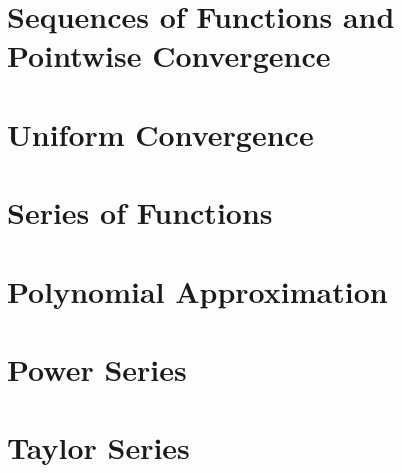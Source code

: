 \documentclass{book}
\begin{document}
\section{Sequences of Functions and Pointwise Convergence}
\section{Uniform Convergence}
\section{Series of Functions}
\section{Polynomial Approximation}
\section{Power Series}
\section{Taylor Series}
\end{document}
